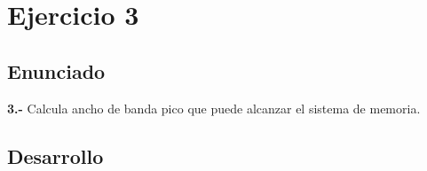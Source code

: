 \section{Ejercicio 3}
\subsection{Enunciado}
\begin{ejer}
    \textbf{3.-} Calcula ancho de banda pico que puede alcanzar el sistema de memoria.
\end{ejer}
\subsection{Desarrollo}

